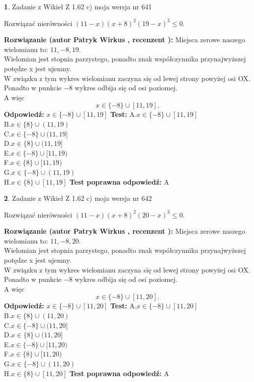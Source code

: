 \documentclass[12pt, a4paper]{article}
\theoremstyle{definition} %
\newtheorem{zad}{}
\newcommand{\zadStart}[1]{\begin{zad}#1\newline}
\newcommand{\zadStop}{\end{zad}}
\newcommand{\rozwStart}[2]{\noindent \textbf{Rozwiązanie (autor #1 , recenzent #2): }\newline}
\newcommand{\rozwStop}{\newline}
\newcommand{\odpStart}{\noindent \textbf{Odpowiedź:}\newline}
\newcommand{\odpStop}{\newline}
\newcommand{\testStart}{\noindent \textbf{Test:}\newline}
\newcommand{\testStop}{\newline}
\newcommand{\kluczStart}{\noindent \textbf{Test poprawna odpowiedź:}\newline}
\newcommand{\kluczStop}{\newline}
\begin{document}
\zadStart{Zadanie z Wikieł Z 1.62 c) moja wersja nr 641}

Rozwiązać nierówności $(11-x)(x+8)^{2}(19-x)^{3}\le0$.
\zadStop
\rozwStart{Patryk Wirkus}{}
Miejsca zerowe naszego wielomianu to: $11, -8, 19$.\\
Wielomian jest stopnia parzystego, ponadto znak współczynnika przy\linebreak najwyższej potędze x jest ujemny.\\ W związku z tym wykres wielomianu zaczyna się od lewej strony powyżej osi OX.\\
Ponadto w punkcie $-8$ wykres odbija się od osi poziomej.\\
A więc $$x \in \{-8\} \cup [11,19].$$
\rozwStop
\odpStart
$x \in \{-8\} \cup [11,19]$
\odpStop
\testStart
A.$x \in \{-8\} \cup [11,19]$\\
B.$x \in \{8\} \cup (11,19)$\\
C.$x \in \{-8\} \cup (11,19]$\\
D.$x \in \{8\} \cup (11,19]$\\
E.$x \in \{-8\} \cup [11,19)$\\
F.$x \in \{8\} \cup [11,19)$\\
G.$x \in \{-8\} \cup (11,19)$\\
H.$x \in \{8\} \cup [11,19]$
\testStop
\kluczStart
A
\kluczStop



\zadStart{Zadanie z Wikieł Z 1.62 c) moja wersja nr 642}

Rozwiązać nierówności $(11-x)(x+8)^{2}(20-x)^{3}\le0$.
\zadStop
\rozwStart{Patryk Wirkus}{}
Miejsca zerowe naszego wielomianu to: $11, -8, 20$.\\
Wielomian jest stopnia parzystego, ponadto znak współczynnika przy\linebreak najwyższej potędze x jest ujemny.\\ W związku z tym wykres wielomianu zaczyna się od lewej strony powyżej osi OX.\\
Ponadto w punkcie $-8$ wykres odbija się od osi poziomej.\\
A więc $$x \in \{-8\} \cup [11,20].$$
\rozwStop
\odpStart
$x \in \{-8\} \cup [11,20]$
\odpStop
\testStart
A.$x \in \{-8\} \cup [11,20]$\\
B.$x \in \{8\} \cup (11,20)$\\
C.$x \in \{-8\} \cup (11,20]$\\
D.$x \in \{8\} \cup (11,20]$\\
E.$x \in \{-8\} \cup [11,20)$\\
F.$x \in \{8\} \cup [11,20)$\\
G.$x \in \{-8\} \cup (11,20)$\\
H.$x \in \{8\} \cup [11,20]$
\testStop
\kluczStart
A
\kluczStop
\end{document}
